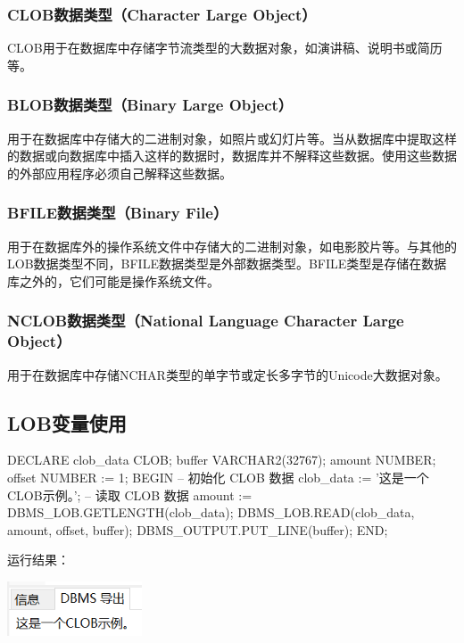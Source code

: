 \documentclass[11pt, a4paper, oneside, UTF8]{ctexbook}
\begin{document}
\subsubsection{CLOB数据类型（Character Large Object）}
CLOB用于在数据库中存储字节流类型的大数据对象，如演讲稿、说明书或简历等。
\subsubsection{BLOB数据类型（Binary Large Object）}
用于在数据库中存储大的二进制对象，如照片或幻灯片等。当从数据库中提取这样的数据或向数据库中插入这样的数据时，数据库并不解释这些数据。使用这些数据的外部应用程序必须自己解释这些数据。
\subsubsection{BFILE数据类型（Binary File）}
用于在数据库外的操作系统文件中存储大的二进制对象，如电影胶片等。与其他的LOB数据类型不同，BFILE数据类型是外部数据类型。BFILE类型是存储在数据库之外的，它们可能是操作系统文件。
\subsubsection{NCLOB数据类型（National Language Character Large Object）}用于在数据库中存储NCHAR类型的单字节或定长多字节的Unicode大数据对象。
\subsection{LOB变量使用}
\begin{plsql}[caption=LOB变量使用示例代码]
DECLARE
  clob_data CLOB;
  buffer VARCHAR2(32767);
  amount NUMBER;
  offset NUMBER := 1;
BEGIN
  -- 初始化 CLOB 数据
  clob_data := '这是一个CLOB示例。';
  -- 读取 CLOB 数据
  amount := DBMS_LOB.GETLENGTH(clob_data);
  DBMS_LOB.READ(clob_data, amount, offset, buffer);
  DBMS_OUTPUT.PUT_LINE(buffer);
END;
\end{plsql}

运行结果：
\begin{center}
  \begin{minipage}{\textwidth}
    \center
    \includegraphics[width=0.3\textwidth]{picture/CLOB示例.png}
    \captionsetup{hypcap=false}
    \label{fig:CLOB示例}
  \end{minipage}
\end{center}
\end{document}
